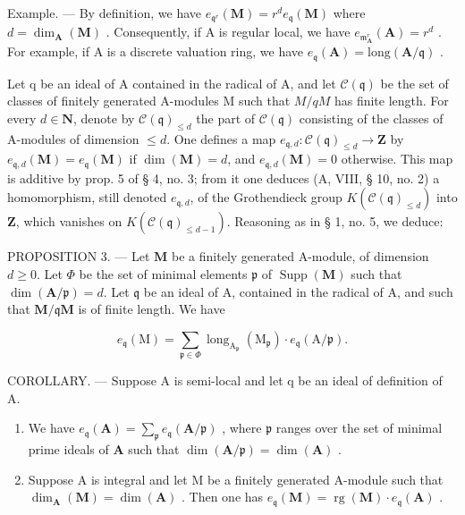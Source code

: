 Example. --- By definition, we have \(e_{\mathfrak{q}^{r}}(\mathbf{M}) = r^{d}e_{\mathfrak{q}}(\mathbf{M})\) where \(d = \dim_{\mathbf{A}}(\mathbf{M})\) . Consequently, if A is regular local, we have \(e_{\mathfrak{m}_{\mathbf{A}}^{r}}(\mathbf{A}) = r^{d}\) . For example, if A is a discrete valuation ring, we have \(e_{\mathfrak{q}}(\mathbf{A}) = \text{long}(\mathbf{A}/\mathfrak{q})\) .

Let q be an ideal of A contained in the radical of A, and let \(\mathcal{C}(\mathfrak{q})\) be the set of classes of finitely generated A-modules M such that \(M/qM\) has finite length. For every \(d \in \mathbf{N}\), denote by \(\mathcal{C}(\mathfrak{q})_{\leq d}\) the part of \(\mathcal{C}(\mathfrak{q})\) consisting of the classes of A-modules of dimension \(\leqslant d\). One defines a map \(e_{\mathfrak{q},d}: \mathcal{C}(\mathfrak{q})_{\leq d} \to \mathbf{Z}\) by \(e_{\mathfrak{q},d}(\mathbf{M}) = e_{\mathfrak{q}}(\mathbf{M})\) if \(\dim(\mathbf{M}) = d\), and \(e_{\mathfrak{q},d}(\mathbf{M}) = 0\) otherwise. This map is additive by prop. 5 of § 4, no. 3; from it one deduces (A, VIII, § 10, no. 2) a homomorphism, still denoted \(e_{\mathfrak{q},d}\), of the Grothendieck group \(K(\mathcal{C}(\mathfrak{q})_{\leq d})\) into \(\mathbf{Z}\), which vanishes on \(K(\mathcal{C}(\mathfrak{q})_{\leq d-1})\). Reasoning as in § 1, no. 5, we deduce:

PROPOSITION 3. — Let \(\mathbf{M}\) be a finitely generated A-module, of dimension \(d \geqslant 0\). Let \(\Phi\) be the set of minimal elements \(\mathfrak{p}\) of \(\operatorname{Supp}(\mathbf{M})\) such that \(\dim(\mathbf{A}/\mathfrak{p}) = d\). Let \(\mathfrak{q}\) be an ideal of A, contained in the radical of A, and such that \(\mathbf{M}/\mathfrak{q}\mathbf{M}\) is of finite length. We have

\[
e _ {\mathfrak {q}} (\mathrm{M}) = \sum_ {\mathfrak {p} \in \Phi} \operatorname{long} _ {\mathrm{A} _ {\mathfrak {p}}} (\mathrm{M} _ {\mathfrak {p}}) \cdot e _ {\mathfrak {q}} (\mathrm{A} / \mathfrak {p}).
\]

COROLLARY. — Suppose A is semi-local and let q be an ideal of definition of A.

\begin{enumerate}
\def\labelenumi{\alph{enumi})}
\item
  We have \(e_{\mathfrak{q}}(\mathbf{A}) = \sum_{\mathfrak{p}} e_{\mathfrak{q}}(\mathbf{A}/\mathfrak{p})\) , where \(\mathfrak{p}\) ranges over the set of minimal prime ideals of \(\mathbf{A}\) such that \(\dim(\mathbf{A}/\mathfrak{p}) = \dim(\mathbf{A})\) .
\item
  Suppose A is integral and let M be a finitely generated A-module such that \(\dim_{\mathbf{A}}(\mathbf{M}) = \dim(\mathbf{A})\) . Then one has \(e_{\mathfrak{q}}(\mathbf{M}) = \operatorname{rg}(\mathbf{M}) \cdot e_{\mathfrak{q}}(\mathbf{A})\) .
\end{enumerate}

